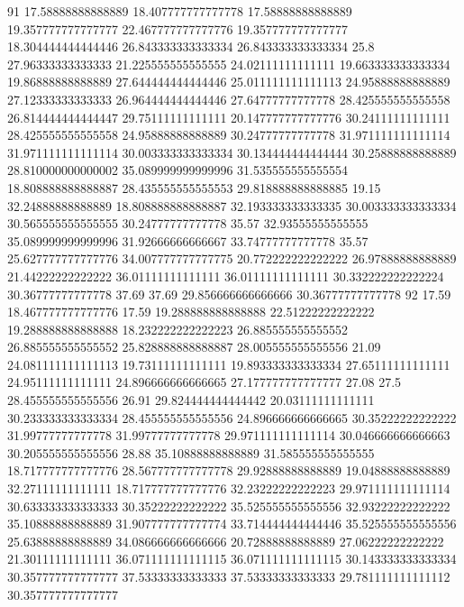 91 17.58888888888889 18.407777777777778 17.58888888888889 19.357777777777777 22.467777777777776 19.357777777777777 18.304444444444446 26.843333333333334 26.843333333333334 25.8 27.96333333333333 21.225555555555555 24.02111111111111 19.663333333333334 19.86888888888889 27.644444444444446 25.011111111111113 24.95888888888889 27.12333333333333 26.964444444444446 27.64777777777778 28.425555555555558 26.814444444444447 29.75111111111111 20.147777777777776 30.24111111111111 28.425555555555558 24.95888888888889 30.24777777777778 31.971111111111114 31.971111111111114 30.003333333333334 30.134444444444444 30.25888888888889 28.810000000000002 35.089999999999996 31.535555555555554 18.808888888888887 28.435555555555553 29.818888888888885 19.15 32.24888888888889 18.808888888888887 32.193333333333335 30.003333333333334 30.565555555555555 30.24777777777778 35.57 32.93555555555555 35.089999999999996 31.92666666666667 33.74777777777778 35.57 25.627777777777776 34.007777777777775 20.772222222222222 26.97888888888889 21.44222222222222 36.01111111111111 36.01111111111111 30.332222222222224 30.36777777777778 37.69 37.69 29.856666666666666 30.36777777777778
92 17.59 18.467777777777776 17.59 19.288888888888888 22.51222222222222 19.288888888888888 18.232222222222223 26.885555555555552 26.885555555555552 25.828888888888887 28.005555555555556 21.09 24.081111111111113 19.73111111111111 19.893333333333334 27.65111111111111 24.95111111111111 24.896666666666665 27.177777777777777 27.08 27.5 28.455555555555556 26.91 29.824444444444442 20.03111111111111 30.233333333333334 28.455555555555556 24.896666666666665 30.35222222222222 31.99777777777778 31.99777777777778 29.971111111111114 30.046666666666663 30.205555555555556 28.88 35.10888888888889 31.585555555555555 18.717777777777776 28.567777777777778 29.92888888888889 19.04888888888889 32.27111111111111 18.717777777777776 32.23222222222223 29.971111111111114 30.633333333333333 30.35222222222222 35.525555555555556 32.93222222222222 35.10888888888889 31.907777777777774 33.714444444444446 35.525555555555556 25.63888888888889 34.086666666666666 20.72888888888889 27.06222222222222 21.30111111111111 36.071111111111115 36.071111111111115 30.143333333333334 30.357777777777777 37.53333333333333 37.53333333333333 29.781111111111112 30.357777777777777
